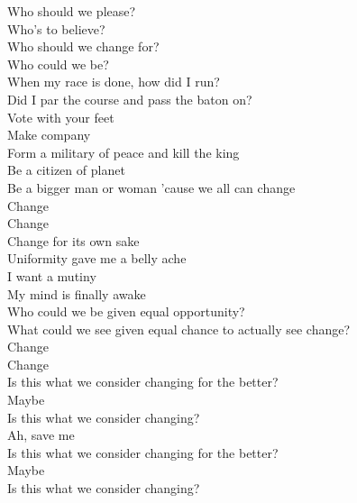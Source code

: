 




Who should we please? \\
Who's to believe? \\
Who should we change for? \\
Who could we be? \\
When my race is done, how did I run? \\
Did I par the course and pass the baton on? \\

Vote with your feet \\
Make company \\
Form a military of peace and kill the king \\
Be a citizen of planet  \\
Be a bigger man or woman 'cause we all can change \\

Change \\
Change \\

Change for its own sake \\
Uniformity gave me a belly ache \\
I want a mutiny \\
My mind is finally awake \\
Who could we be given equal opportunity? \\
What could we see given equal chance to actually see change? \\

Change \\
Change \\

Is this what we consider changing for the better? \\
Maybe \\

Is this what we consider changing? \\
Ah, save me \\
Is this what we consider changing for the better? \\
Maybe \\
Is this what we consider changing? \\

